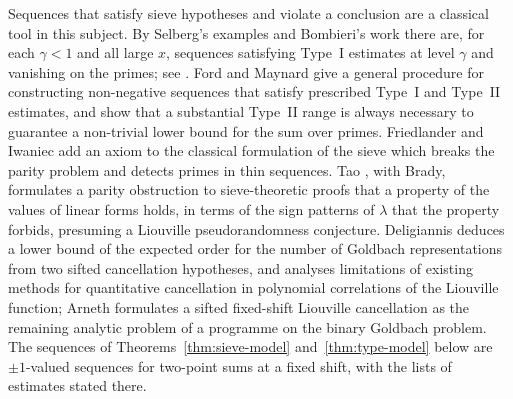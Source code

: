 \documentclass[11pt]{article}
\theoremstyle{definition}
\theoremstyle{remark}
\numberwithin{equation}{section}
\begin{document}
Sequences that satisfy sieve hypotheses and violate a conclusion are a classical tool in this subject. By
Selberg's examples and Bombieri's work there are, for each $\gamma<1$ and all large $x$, sequences satisfying
Type~I estimates at level $\gamma$ and vanishing on the primes; see
\cite[Section~1 and the remark after Proposition~4.10]{FordMaynard}. Ford and Maynard \cite{FordMaynard}
give a general procedure for constructing non-negative sequences that satisfy prescribed Type~I and Type~II
estimates, and show that a substantial Type~II range is always necessary to guarantee a non-trivial lower
bound for the sum over primes. Friedlander and Iwaniec \cite{FIAsymptotic} add an axiom to the classical
formulation of the sieve which breaks the parity problem and detects primes in thin sequences. Tao
\cite{TaoParity}, with Brady, formulates a parity obstruction to sieve-theoretic proofs that a property of
the values of linear forms holds, in terms of the sign patterns of $\lambda$ that the property forbids,
presuming a Liouville pseudorandomness conjecture. Deligiannis \cite{Deligiannis2026} deduces a lower bound
of the expected order for the number of Goldbach representations from two sifted cancellation hypotheses,
and \cite{DeligiannisObstructions} analyses limitations of existing methods for quantitative cancellation in
polynomial correlations of the Liouville function; Arneth \cite{Arneth2026} formulates a sifted fixed-shift Liouville cancellation as the
remaining analytic problem of a programme on the binary Goldbach problem. The sequences of
Theorems~\ref{thm:sieve-model} and~\ref{thm:type-model} below are $\pm1$-valued sequences for two-point sums
at a fixed shift, with the lists of estimates stated there.
\end{document}
